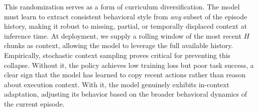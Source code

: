 This randomization serves as a form of curriculum diversification. The model must learn to extract consistent behavioral style from \emph{any} subset of the episode history, making it robust to missing, partial, or temporally displaced context at inference time. 
At deployment, we supply a rolling window of the most recent $H$ chunks as context, allowing the model to leverage the full available history.
Empirically, stochastic context sampling proves critical for preventing this collapse. Without it, the policy achieves low training loss but poor task success, a clear sign that the model has learned to copy recent actions rather than reason about execution context. With it, the model genuinely exhibits in-context adaptation, adjusting its behavior based on the broader behavioral dynamics of the current episode.
